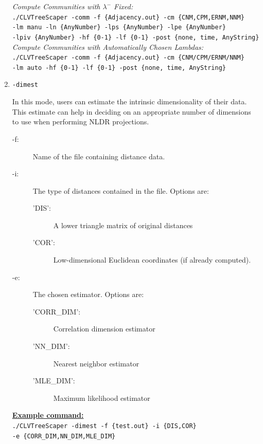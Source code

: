 \documentclass[11pt]{article}
\begin{document}
\begin{enumerate}[{\bf (1)}]
{\it Compute Communities with $\lambda^{-}$ Fixed:} \\
{\tt ./CLVTreeScaper -comm -f \{Adjacency.out\} -cm \{CNM,CPM,ERNM,NNM\}}\\
{\tt -lm manu -ln \{AnyNumber\} -lps \{AnyNumber\} -lpe \{AnyNumber\}}\\
{\tt -lpiv \{AnyNumber\} -hf \{0-1\} -lf \{0-1\} -post \{none, time, AnyString\}}\\


{\it Compute Communities with Automatically Chosen Lambdas:} \\
{\tt ./CLVTreeScaper -comm -f \{Adjacency.out\} -cm \{CNM/CPM/ERNM/NNM\} }\\
{\tt -lm auto -hf \{0-1\} -lf \{0-1\} -post \{none, time, AnyString\}} \\


\item {\tt -dimest}

In this mode, users can estimate the intrinsic dimensionality of their data. This estimate can
help in deciding on an appropriate number of dimensions to use when performing NLDR
projections.
	\begin{description}
	\item[-f:] Name of the file containing distance data.
	
	\item[-i:] The type of distances contained in the file. Options are:
		\begin{description}
		\item['DIS':] A lower triangle matrix of original distances
		\item['COR':] Low-dimensional Euclidean coordinates (if already computed).
		\end{description}
	
	\item[-e:] The chosen estimator. Options are:
		\begin{description}
		\item['CORR\_DIM':] Correlation dimension estimator
		\item['NN\_DIM':] Nearest neighbor estimator
		\item['MLE\_DIM':] Maximum likelihood estimator
		\end{description}
	\end{description}

\ul{\bf Example command:}\\
{\tt ./CLVTreeScaper -dimest -f \{test.out\} -i \{DIS,COR\}}\\
{\tt  -e \{CORR\_DIM,NN\_DIM,MLE\_DIM\}} \\
\end{enumerate}
\end{document}
